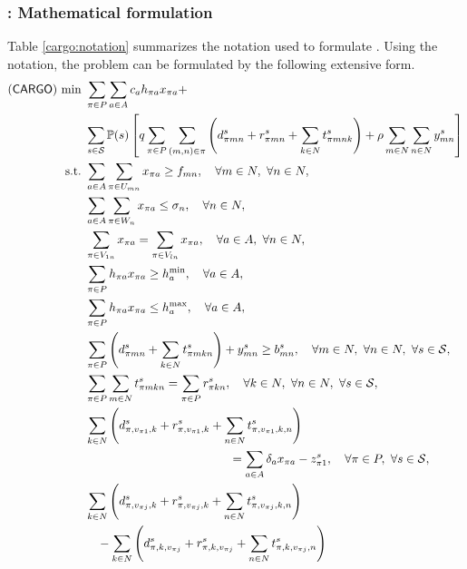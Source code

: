 \subsubsection{\cargo: Mathematical formulation}
Table \ref{cargo:notation} summarizes the notation used to formulate \cargo. Using the notation, the problem can be formulated by the following extensive form.
\begin{subequations} \label{cargo:formulation}
	\begin{align}
	(\cargo)\ \textrm{min}\ &\sum_{\pi\in P}\sum_{a\in A}c_a h_{\pi a}x_{\pi a}+ \nonumber \\ &\sum_{s\in\mathcal{S}}\PP(s)\left[q\sum_{\pi\in P}\sum_{(m,n)\in\pi}\left(d_{\pi m n}^s+r_{\pi m n}^s+\sum_{k\in N}t_{\pi m n k}^s\right)+\rho\sum_{m\in N}\sum_{n\in N}y_{mn}^s \right] \label{cargo:obj} \\ 
	\textrm{s.t.}\ & \sum_{a\in A}\sum_{\pi\in U_{mn}}x_{\pi a}\ge f_{mn},\quad\forall m\in N,\ \forall n\in N,\label{cargo:b}\\
	&\sum_{a\in A}\sum_{\pi\in W_n}x_{\pi a}\le \sigma_n,\quad\forall n\in N, \label{cargo:c}\\
	&\sum_{\pi\in V_{1n}}x_{\pi a}=\sum_{\pi\in V_{ln}}x_{\pi a},\quad\forall a\in A,\ \forall n\in N,\label{cargo:d}\\
	&\sum_{\pi\in P}h_{\pi a}x_{\pi a}\ge h_a^{\textrm{min}},\quad\forall a\in A, \label{cargo:e}\\
	&\sum_{\pi\in P}h_{\pi a}x_{\pi a}\le h_a^{\textrm{max}},\quad\forall a\in A, \label{cargo:f}\\	
	&\sum_{\pi \in P}\left(d_{\pi m n}^s+\sum_{k\in N}t_{\pi mkn}^s\right)+y_{mn}^s\ge b_{mn}^s,\quad\forall m\in N,\ \forall n\in N,\ \forall s\in\mathcal{S}, \label{cargo:g}\\
	&\sum_{\pi \in P}\sum_{m\in N}t_{\pi mkn}^s=\sum_{\pi \in P}r_{\pi kn}^s,\quad\forall k\in N,\ \forall n\in N,\ \forall s\in\mathcal{S},\label{cargo:h}\\
	&\sum_{k\in N}\left(d_{\pi,v_{\pi 1},k}^s+r_{\pi,v_{\pi 1},k}^s+\sum_{n\in N}t_{\pi,v_{\pi 1},k,n}^s\right)\nonumber\\
	&\qquad\qquad\qquad\qquad\qquad\qquad=\sum_{a\in A}\delta_a x_{\pi a}-z_{\pi 1}^s,\quad\forall \pi\in P,\ \forall s\in\mathcal{S}, \label{cargo:i}\\
	&\sum_{k\in N}\left(d_{\pi,v_{\pi j},k}^s+r_{\pi,v_{\pi j},k}^s+\sum_{n\in N}t_{\pi,v_{\pi j},k,n}^s\right) \nonumber\\
	&\quad-\sum_{k\in N}\left(d_{\pi,k,v_{\pi j}}^s+r_{\pi,k,v_{\pi j}}^s+\sum_{n\in N}t_{\pi,k,v_{\pi j},n}^s\right) \nonumber\\

\end{align}
\end{subequations}
